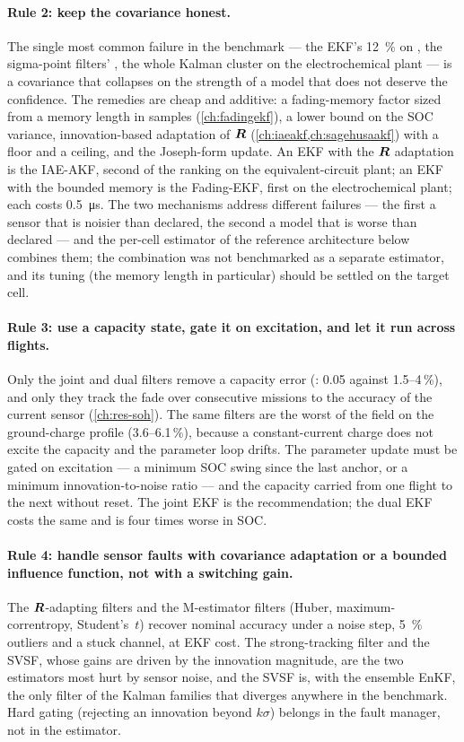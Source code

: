 \paragraph{Rule 2: keep the covariance honest.} The single most common failure in the
benchmark --- the EKF's \SI{12}{\percent} on , the sigma-point filters'
, the whole Kalman cluster on the electrochemical plant --- is a
covariance that collapses on the strength of a model that does not deserve the confidence. The
remedies are cheap and additive: a fading-memory factor sized from a memory length in samples
(\cref{ch:fadingekf}), a lower bound on the SOC variance, innovation-based adaptation of $\bm{R}$
(\cref{ch:iaeakf,ch:sagehusaakf}) with a floor and a ceiling, and the Joseph-form update. An EKF
with the $\bm{R}$ adaptation is the IAE-AKF, second of the ranking on the equivalent-circuit plant;
an EKF with the bounded memory is the Fading-EKF, first on the electrochemical plant; each
costs \SI{0.5}{\micro\second}. The two mechanisms address different failures --- the first a
sensor that is noisier than declared, the second a model that is worse than declared --- and
the per-cell estimator of the reference architecture below combines them; the combination was
not benchmarked as a separate estimator, and its tuning (the memory length in particular)
should be settled on the target cell.

\paragraph{Rule 3: use a capacity state, gate it on excitation, and let it run across flights.}
Only the joint and dual filters remove a capacity error (: \num{0.05} against
\num{1.5}--\num{4}\,\%), and only they track the fade over consecutive missions to the accuracy
of the current sensor (\cref{ch:res-soh}). The same filters are the worst of the field on the
ground-charge profile (\num{3.6}--\num{6.1}\,\%), because a constant-current charge does not
excite the capacity and the parameter loop drifts. The parameter update must be gated on
excitation --- a minimum SOC swing since the last anchor, or a minimum innovation-to-noise
ratio --- and the capacity carried from one flight to the next without reset. The joint EKF is
the recommendation; the dual EKF costs the same and is four times worse in SOC.

\paragraph{Rule 4: handle sensor faults with covariance adaptation or a bounded influence
function, not with a switching gain.} The $\bm{R}$-adapting filters and the M-estimator filters
(Huber, maximum-correntropy, Student's~$t$) recover nominal accuracy under a noise step,
\SI{5}{\percent} outliers and a stuck channel, at EKF cost. The strong-tracking filter and
the SVSF, whose gains are driven by the innovation magnitude, are the two estimators most hurt
by sensor noise, and the SVSF is, with the ensemble EnKF, the only filter of the Kalman
families that diverges anywhere in the benchmark. Hard gating (rejecting an innovation beyond $k\sigma$) belongs in the fault
manager, not in the estimator.

